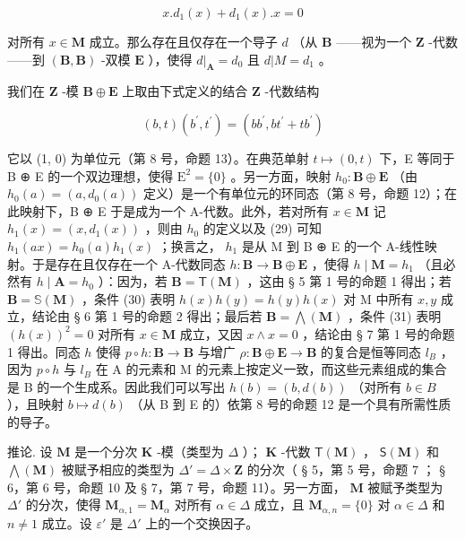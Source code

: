 \[
x. d _ {1} (x) + d _ {1} (x). x = 0\tag{31}
\]

对所有 \(x \in \mathbf{M}\) 成立。那么存在且仅存在一个导子 \(d\) （从 \(\mathbf{B}\) ——视为一个 \(\mathbf{Z}\) -代数——到 \((\mathbf{B}, \mathbf{B})\) -双模 \(\mathbf{E}\) ），使得 \(d|_{\mathbf{A}} = d_0\) 且 \(d|M = d_1\) 。

我们在 \(\mathbf{Z}\) -模 \(\mathbf{B} \oplus \mathbf{E}\) 上取由下式定义的结合 \(\mathbf{Z}\) -代数结构

\[
(b, t) (b ^ {\prime}, t ^ {\prime}) = (b b ^ {\prime}, b t ^ {\prime} + t b ^ {\prime})
\]

它以 (1, 0) 为单位元（第 8 号，命题 13）。在典范单射 \(t \mapsto (0, t)\) 下，E 等同于 B ⊕ E 的一个双边理想，使得 \(\mathrm{E}^2 = \{0\}\) 。另一方面，映射 \(h_0 \colon \mathbf{B} \oplus \mathbf{E}\) （由 \(h_0(a) = (a, d_0(a))\) 定义）是一个有单位元的环同态（第 8 号，命题 12）；在此映射下，B ⊕ E 于是成为一个 A-代数。此外，若对所有 \(x \in \mathbf{M}\) 记 \(h_1(x) = (x, d_1(x))\) ，则由 \(h_0\) 的定义以及 (29) 可知 \(h_1(ax) = h_0(a)h_1(x)\) ；换言之， \(h_1\) 是从 M 到 B ⊕ E 的一个 A-线性映射。于是存在且仅存在一个 A-代数同态 \(h \colon \mathbf{B} \to \mathbf{B} \oplus \mathbf{E}\) ，使得 \(h \mid \mathbf{M} = h_1\) （且必然有 \(h \mid \mathbf{A} = h_0\) ）：因为，若 \(\mathbf{B} = \mathsf{T}(\mathbf{M})\) ，这由 § 5 第 1 号的命题 1 得出；若 \(\mathbf{B} = \mathbb{S}(\mathbf{M})\) ，条件 (30) 表明 \(h(x)h(y) = h(y)h(x)\) 对 M 中所有 \(x, y\) 成立，结论由 § 6 第 1 号的命题 2 得出；最后若 \(\mathbf{B} = \bigwedge (\mathbf{M})\) ，条件 (31) 表明 \((h(x))^2 = 0\) 对所有 \(x \in \mathbf{M}\) 成立，又因 \(x \wedge x = 0\) ，结论由 § 7 第 1 号的命题 1 得出。同态 \(h\) 使得 \(p \circ h \colon \mathbf{B} \to \mathbf{B}\) 与增广 \(\rho \colon \mathbf{B} \oplus \mathbf{E} \to \mathbf{B}\) 的复合是恒等同态 \(l_B\) ，因为 \(p \circ h\) 与 \(l_B\) 在 A 的元素和 M 的元素上按定义一致，而这些元素组成的集合是 B 的一个生成系。因此我们可以写出 \(h(b) = (b, d(b))\) （对所有 \(b \in B\) ），且映射 \(b \mapsto d(b)\) （从 B 到 E 的）依第 8 号的命题 12 是一个具有所需性质的导子。

推论. 设 \(\mathbf{M}\) 是一个分次 \(\mathbf{K}\) -模（类型为 \(\Delta\) ）； \(\mathbf{K}\) -代数 \(\mathsf{T}(\mathbf{M})\) ， \(\mathsf{S}(\mathbf{M})\) 和 \(\bigwedge (\mathbf{M})\) 被赋予相应的类型为 \(\Delta' = \Delta \times \mathbf{Z}\) 的分次（ § 5，第 5 号，命题 7 ； § 6，第 6 号，命题 10 及 § 7，第 7 号，命题 11）。另一方面， \(\mathbf{M}\) 被赋予类型为 \(\Delta'\) 的分次，使得 \(\mathbf{M}_{\alpha,1} = \mathbf{M}_{\alpha}\) 对所有 \(\alpha \in \Delta\) 成立，且 \(\mathbf{M}_{\alpha,n} = \{0\}\) 对 \(\alpha \in \Delta\) 和 \(n \neq 1\) 成立。设 \(\varepsilon'\) 是 \(\Delta'\) 上的一个交换因子。

